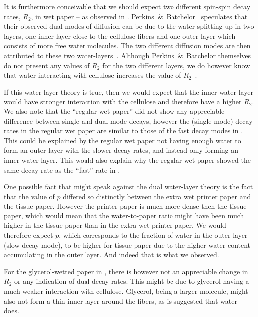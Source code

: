 \documentclass[11pt,a4paper, twocolumn,
swedish, english %
]{article}
\begin{document}
It is furthermore conceivable that we should expect two different
spin-spin decay rates, $R_2$, in wet paper -- as observed in
. Perkins~\&~Batchelor~\cite{Perkins-Batchelor2012}
speculates that their observed dual modes of diffusion can be due to
the water splitting up in two layers, one inner layer close to the
cellulose fibers and one outer layer which consists of more free water
molecules. 
The two different diffusion modes are then attributed to these two
water-layers~\cite{Perkins-Batchelor2012}. Although
Perkins~\&~Batchelor themselves do not present any values of $R_2$ for
the two different layers, we do however know that water interacting
with cellulose increases the value of $R_2$~\cite{Ono-etal2004}.

If this water-layer theory is true, then we would expect that the
inner water-layer would have stronger interaction with the cellulose
and therefore have a higher $R_2$. We also note that the ``regular wet
paper'' did not show any appreciable difference between single and
dual mode decays, however the (single mode) decay rates in the regular
wet paper are similar to those of the fast decay modes in
. This could be explained by the regular wet
paper not having enough water to form an outer layer with the slower
decay rates, and instead only forming an inner water-layer.
This would also explain why the regular wet paper showed the same
decay rate as the ``fast'' rate in .

One possible fact that might speak against the dual water-layer
theory is the fact that the value of $p$ differed so distinctly
between the extra wet printer paper and the tissue paper. However the
printer paper is much more dense then the tissue paper, which would
mean that the water-to-paper ratio might have been much higher in the
tissue paper than in the extra wet printer paper. We would therefore
expect $p$, which corresponds to the fraction of water in the outer
layer (slow decay mode), to be higher for tissue paper due to the
higher water content accumulating in the outer layer. And indeed that
is what we observed. 

For the glycerol-wetted paper in , there is however
not an appreciable change in $R_2$ or any indication of dual
decay rates. This might be due to glycerol having a much weaker
interaction with cellulose. Glycerol, being a larger molecule, might
also not form a thin inner layer around the fibers, as is suggested
that water does. 
\end{document}
